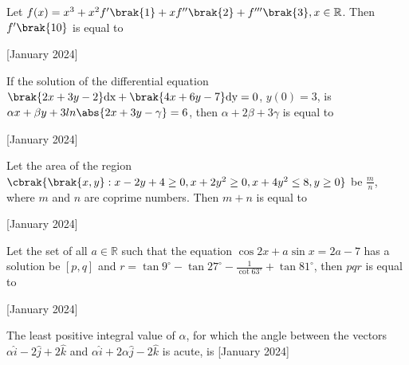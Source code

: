 \item Let $f(x)=x^3+x^2f'\brak{1}+xf''\brak{2}+f'''\brak{3}, x \in \mathbb R$. Then $f'\brak{10}$ is equal to \underline{\hspace{1cm}}

    \hfill{[January 2024]}\\

\item If the solution of the differential equation $\brak{2x+3y-2}\text{dx}+\brak{4x+6y-7}\text{dy}=0$, $y(0)=3$, is $\alpha x+\beta y+3 ln\abs{2x+3y-\gamma}=6$, then $\alpha+2\beta+3\gamma$ is equal to \underline{\hspace{1cm}}

    \hfill{[January 2024]}\\

\item Let the area of the region $\cbrak{\brak{x,y}: x-2y+4\geq 0,x+2y^2\geq 0,x+4y^2\leq 8,y\geq 0}$ be $\frac{m}{n}$, where $m$ and $n$ are coprime numbers. Then $m+n$ is equal to \underline{\hspace{1cm}}
    
    \hfill{[January 2024]}\\

\item Let the set of all $a\in \mathbb R$ such that the equation $\cos 2x+a\sin x=2a-7$ has a solution be ${[p,q]}$ and $r=\tan 9^{\circ}-\tan 27^{\circ}-\frac{1}{\cot 63^{\circ}}+\tan 81^{\circ}$, then $pqr$ is equal to \underline{\hspace{1cm}}
    
    \hfill{[January 2024]}\\
  
\item The least positive integral value of $\alpha$, for which the angle between the vectors $\alpha\hat{i}-2\hat{j}+2\hat{k}$ and $\alpha\hat{i}+2\alpha\hat{j}-2\hat{k}$ is acute, is \underline{\hspace{1cm}} \hfill{[January 2024]}\\
